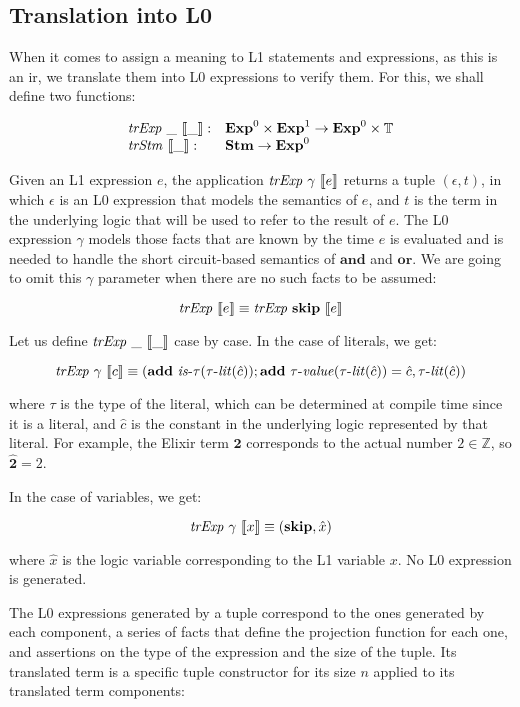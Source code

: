 \subsection{Translation into L0}
\label{sec:translationL0}

When it comes to assign a meaning to L1 statements and expressions, as this is
an \gls{ir}, we translate them into L0 expressions to verify them. For this, we
shall define two functions:

\[
\begin{array}{ll}
\mathit{trExp}~\_~\llbracket\_\rrbracket : & \mathbf{Exp}^{0} \times \mathbf{Exp}^{1} \rightarrow \mathbf{Exp}^{0} \times \mathbb{T}\\
\mathit{trStm}~\llbracket\_\rrbracket : & \mathbf{Stm} \rightarrow \mathbf{Exp}^{0}
\end{array}
\]

Given an L1 expression $e$, the application $\mathit{trExp}~\gamma~\llbracket e\rrbracket$ returns a tuple 
$(\epsilon, t)$, in which $\epsilon$ is an L0 expression that models the
semantics of $e$, and $t$ is the term in the underlying logic that will be used
to refer to the result of $e$. The L0 expression $\gamma$ models those facts
that are known by the time $e$ is evaluated and is needed to handle the short
circuit-based semantics of $\mathbf{and}$ and $\mathbf{or}$. We are going to
omit this $\gamma$ parameter when there are no such facts to be assumed:

\[
\mathit{trExp}~\llbracket e\rrbracket \equiv \mathit{trExp}~\textbf{skip}~\llbracket e\rrbracket
\]

Let us define $\mathit{trExp}~\_~\llbracket\_\rrbracket$ case by case. In the case of literals, we get:

\[
\mathit{trExp}~\gamma~\llbracket c\rrbracket \equiv (\textbf{add}~\mathit{is\mbox{-}\tau}(\mathit{\tau\mbox{-}lit}(\hat{c}));\textbf{add}~\mathit{\tau\mbox{-}value}(\mathit{\tau\mbox{-}lit}(\hat{c})) = \hat{c}, \mathit{\tau\mbox{-}lit}(\hat{c}))
\]

where $\tau$ is the type of the literal, which can be determined at compile time
since it is a literal, and $\hat{c}$ is the constant in the underlying logic
represented by that literal. For example, the Elixir term $\mathbf{2}$
corresponds to the actual number $2 \in \mathbb{Z}$, so $\hat{\mathbf{2}} = 2$.

In the case of variables, we get:

\[
\mathit{trExp}~\gamma~\llbracket x\rrbracket \equiv (\textbf{skip}, \hat{x})
\]

where $\hat{x}$ is the logic variable corresponding to the L1 variable $x$. No
L0 expression is generated.

The L0 expressions generated by a tuple correspond to the ones generated by each
component, a series of facts that define the projection function for each one,
and assertions on the type of the expression and the size of the tuple. Its
translated term is a specific tuple constructor for its size $n$ applied to its
translated term components:

